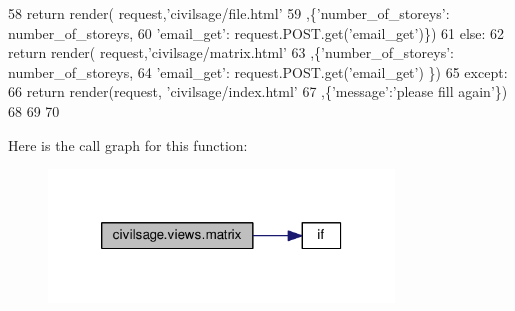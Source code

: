 \begin{DoxyCode}
58             \textcolor{keywordflow}{return} render( request,\textcolor{stringliteral}{'civilsage/file.html'}
59             ,\{\textcolor{stringliteral}{'number\_of\_storeys'}: number\_of\_storeys,
60             \textcolor{stringliteral}{'email\_get'}: request.POST.get(\textcolor{stringliteral}{'email\_get'})\})
61         \textcolor{keywordflow}{else}:
62             \textcolor{keywordflow}{return} render( request,\textcolor{stringliteral}{'civilsage/matrix.html'}
63             ,\{\textcolor{stringliteral}{'number\_of\_storeys'}: number\_of\_storeys,
64             \textcolor{stringliteral}{'email\_get'}: request.POST.get(\textcolor{stringliteral}{'email\_get'}) \})
65     \textcolor{keywordflow}{except}:
66         \textcolor{keywordflow}{return} render(request, \textcolor{stringliteral}{'civilsage/index.html'}
67         ,\{\textcolor{stringliteral}{'message'}:\textcolor{stringliteral}{'please fill again'}\})
68 
69 
70 
\end{DoxyCode}


Here is the call graph for this function\+:
\nopagebreak
\begin{figure}[H]
\begin{center}
\leavevmode
\includegraphics[width=260pt]{namespacecivilsage_1_1views_a8b58c93a9c82e84143c43dafaa744a4b_cgraph}
\end{center}
\end{figure}


